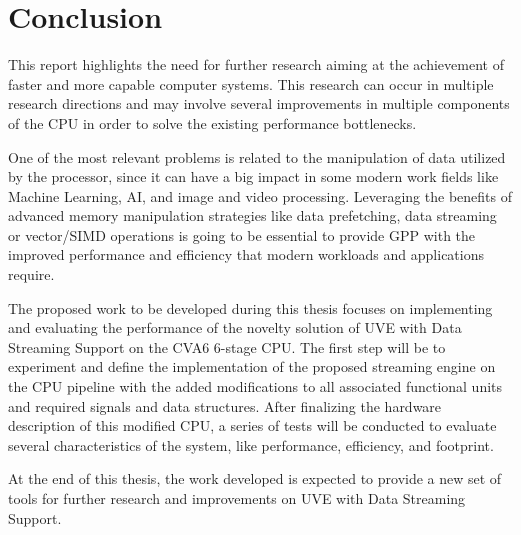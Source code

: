 \chapter{Conclusion}
This report highlights the need for further research aiming at the achievement of faster and more capable computer systems. This research can occur in multiple research directions and may involve several improvements in multiple components of the \acrshort{CPU} in order to solve the existing performance bottlenecks.

One of the most relevant problems is related to the manipulation of data utilized by the processor, since it can have a big impact in some modern work fields like Machine Learning, AI, and image and video processing. Leveraging the benefits of advanced memory manipulation strategies like data prefetching, data streaming or vector/SIMD operations is going to be essential to provide \acrfull{GPP} with the improved performance and efficiency that modern workloads and applications require.

The proposed work to be developed during this thesis focuses on implementing and evaluating the performance of the novelty solution of UVE with Data Streaming Support on the CVA6 6-stage CPU. The first step will be to experiment and define the implementation of the proposed streaming engine on the CPU pipeline with the added modifications to all associated functional units and required signals and data structures. After finalizing the hardware description of this modified CPU, a series of tests will be conducted to evaluate several characteristics of the system, like performance, efficiency, and footprint. 

At the end of this thesis, the work developed is expected to provide a new set of tools for further research and improvements on UVE with Data Streaming Support.








